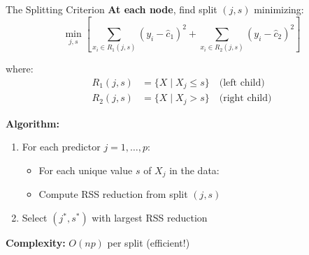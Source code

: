 \documentclass[10pt]{beamer}
\begin{document}
\begin{frame}{The Splitting Criterion}
  \textbf{At each node}, find split $(j, s)$ minimizing:
  \[
  \min_{j, s} \left[ \sum_{x_i \in R_1(j,s)} (y_i - \widehat{c}_1)^2 + \sum_{x_i \in R_2(j,s)} (y_i - \widehat{c}_2)^2 \right]
  \]

  where:
  \begin{align*}
  R_1(j,s) &= \{X \mid X_j \leq s\} \quad \text{(left child)} \\
  R_2(j,s) &= \{X \mid X_j > s\} \quad \text{(right child)}
  \end{align*}

  \vspace{0.5em}
  \textbf{Algorithm:}
  \begin{enumerate}
    \item For each predictor $j = 1, \ldots, p$:
    \begin{itemize}
      \item For each unique value $s$ of $X_j$ in the data:
      \item Compute RSS reduction from split $(j, s)$
    \end{itemize}
    \item Select $(j^*, s^*)$ with largest RSS reduction
  \end{enumerate}

  \vspace{0.5em}
  \textbf{Complexity:} $O(np)$ per split (efficient!)
\end{frame}

\end{document}
